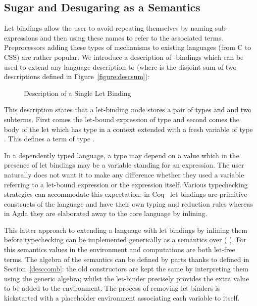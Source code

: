 \subsection{Sugar and Desugaring as a Semantics}\label{section:letbinding}

Let bindings allow the user to avoid repeating themselves by naming
sub-expressions and then using these names to refer to the associated
terms. Preprocessors adding these types of mechanisms to existing
languages (from C to CSS) are rather popular. We introduce a
description of -bindings which can be used to extend any
language description  to    (where 
is the disjoint sum of two descriptions defined in Figure~\ref{figure:descsum}):

\begin{figure}[h]
\caption{Description of a Single Let Binding}
\end{figure}

This description states that a let-binding node stores a pair of types
\AB{$\sigma$} and \AB{$\tau$} and two subterms. First comes the let-bound
expression of type \AB{$\sigma$} and second comes the body of the let which
has type \AB{$\tau$} in a context extended with a fresh variable of type
\AB{$\sigma$}. This defines a term of type \AB{$\tau$}.

In a dependently typed language, a type may depend on a value which
in the presence of let bindings may be a variable standing for an
expression. The user naturally does not want it to make any difference
whether they used a variable referring to a let-bound expression or
the expression itself. Various typechecking strategies can accommodate
this expectation: in Coq~\cite{Coq:manual} let bindings are primitive
constructs of the language and have their own typing and reduction
rules whereas in Agda they are elaborated away to the core language
by inlining.

This latter approach to extending a language  with let bindings
by inlining them before typechecking can be implemented generically as
a semantics over (  ). For this semantics values
in the environment and computations are both let-free terms. The algebra
of the semantics can be defined by parts thanks to  defined in
Section~\ref{desccomb}: the old constructors are kept the same by interpreting
them using the generic  algebra;
whilst the let-binder precisely provides the extra value to be added to the
environment. The process of removing let binders is kickstarted with a
placeholder environment associating each variable to itself.

